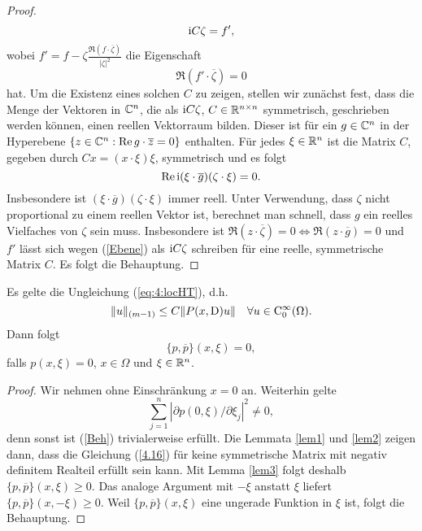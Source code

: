 \begin{proof}
\begin{equation}
	\mathrm i C \zeta = f',
\end{equation}
wobei $f' = f - \zeta \frac{\Re( f\cdot\overline\zeta)}{|\zeta|^2}$ die Eigenschaft
\begin{equation}
	\label{Ebene}
\Re (f'\cdot\overline\zeta) = 0
\end{equation}
hat. Um die Existenz eines solchen $C$ zu zeigen, stellen wir zunächst fest, dass die Menge der Vektoren in $\mathbb C^n$, die als $\mathrm i C \zeta$, $C \in \mathbb R^{n \times n}$ symmetrisch, geschrieben werden können, einen reellen Vektorraum bilden. Dieser ist für ein $g \in \mathbb C^n$ in der Hyperebene $\{ z \in \mathbb C^n : \operatorname{Re} g\cdot \overline z = 0 \}$ enthalten. Für jedes $\xi \in \mathbb R^n$ ist die Matrix $C$, gegeben durch $C x =  (x\cdot\xi)\xi$, symmetrisch und es folgt
\begin{equation}
\operatorname{Re} \mathrm i (\xi\cdot\overline g)(\zeta\cdot\xi) = 0.
\end{equation}
Insbesondere ist $(\xi\cdot\overline g)(\zeta\cdot\xi) $ immer reell. Unter Verwendung, dass $\zeta$ nicht proportional zu einem reellen Vektor ist, berechnet man schnell, dass $g$ ein reelles Vielfaches von $\zeta$ sein muss. Insbesondere ist $\Re(z\cdot\overline\zeta) = 0 \Leftrightarrow \Re(z\cdot \overline g) = 0$ und $f'$ lässt sich wegen (\ref{Ebene}) als $\mathrm i C \zeta$ schreiben für eine reelle, symmetrische Matrix $C$.  Es folgt die Behauptung.
\end{proof}

\begin{thm}
Es gelte die Ungleichung (\ref{eq:4:locHT}), d.h.
\begin{equation}
  \| u\|_{(m-1)} \le C \| P(x,\mathrm D) u \| \quad \forall u\in\mathrm C_0^\infty(\Omega).
\end{equation}
Dann folgt 
\begin{equation}
	\label{Beh}
\{p,\overline p\} (x,\xi) = 0,
\end{equation}
falls $p(x,\xi) = 0$, $x \in \Omega$ und $ \xi \in \mathbb R^n$.
\end{thm}
\begin{proof}
Wir nehmen ohne Einschränkung $x=0$ an. Weiterhin gelte
\begin{equation}
\sum_{j=1}^{n}|\partial p(0,\xi)/\partial \xi_j|^2 \neq 0,
\end{equation}
denn sonst ist (\ref{Beh}) trivialerweise erfüllt. Die Lemmata \ref{lem1} und \ref{lem2} zeigen dann, dass die Gleichung (\ref{4.16}) für keine symmetrische Matrix mit negativ definitem Realteil erfüllt sein kann. Mit Lemma \ref{lem3} folgt deshalb $\{p,\overline p\}(x,\xi) \ge 0$. Das analoge Argument mit $-\xi$ anstatt $\xi$ liefert $\{p,\overline p\}(x,-\xi) \ge 0$. Weil $\{p,\overline p\}(x,\xi)$ eine ungerade Funktion in $\xi$ ist, folgt die Behauptung.
\end{proof}